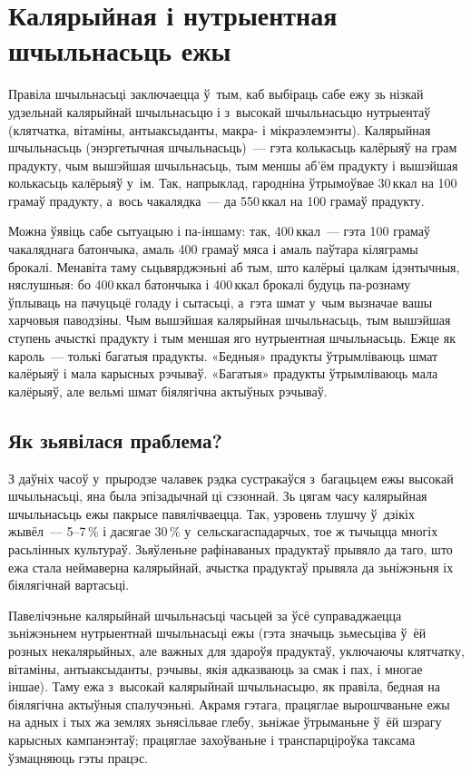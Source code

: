 
\chapter{Калярыйная і нутрыентная шчыльнасьць ежы}

Правіла шчыльнасьці заключаецца ў~тым, каб выбіраць сабе ежу зь нізкай удзельнай калярыйнай шчыльнасьцю і з~высокай шчыльнасьцю нутрыентаў (клятчатка, вітаміны, антыаксыданты, макра- і мікраэлемэнты). Калярыйная шчыльнасьць (энэргетычная шчыльнасьць)~--- гэта колькасьць калёрыяў на грам прадукту, чым вышэйшая шчыльнасьць, тым меншы аб'ём прадукту і вышэйшая колькасьць калёрыяў у~ім. Так, напрыклад, гародніна ўтрымоўвае 30\,ккал на 100 грамаў прадукту, а~вось чакалядка~--- да 550\,ккал на 100 грамаў прадукту.

Можна ўявіць сабе сытуацыю і па-іншаму: так, 400\,ккал~--- гэта 100 грамаў чакаляднага батончыка, амаль 400 грамаў мяса і амаль паўтара кіляграмы брокалі. Менавіта таму сьцьвярджэньні аб тым, што калёрыі цалкам ідэнтычныя, няслушныя: бо 400\,ккал батончыка і 400\,ккал брокалі будуць па-рознаму ўплываць на пачуцьцё голаду і сытасьці, а~гэта шмат у~чым вызначае вашы харчовыя паводзіны. Чым вышэйшая калярыйная шчыльнасьць, тым вышэйшая ступень ачысткі прадукту і тым меншая яго нутрыентная шчыльнасьць. Ежце як кароль~--- толькі багатыя прадукты. «Бедныя» прадукты ўтрымліваюць шмат калёрыяў і мала карысных рэчываў. «Багатыя» прадукты ўтрымліваюць мала калёрыяў, але вельмі шмат біялягічна актыўных рэчываў.

\section{Як зьявілася праблема?}

З даўніх часоў у~прыродзе чалавек рэдка сустракаўся з~багацьцем ежы высокай шчыльнасьці, яна была эпізадычнай ці сэзоннай. Зь цягам часу калярыйная шчыльнасьць ежы пакрысе павялічваецца. Так, узровень тлушчу ў~дзікіх жывёл~--- 5--7\,\% і дасягае 30\,\% у~сельскагаспадарчых, тое ж тычыцца многіх расьлінных культураў. Зьяўленьне рафінаваных прадуктаў прывяло да таго, што ежа стала неймаверна калярыйнай, ачыстка прадуктаў прывяла да зьніжэньня іх біялягічнай вартасьці.

Павелічэньне калярыйнай шчыльнасьці часьцей за ўсё суправаджаецца зьніжэньнем нутрыентнай шчыльнасьці ежы (гэта значыць зьмесьціва ў~ёй розных некалярыйных, але важных для здароўя прадуктаў, уключаючы клятчатку, вітаміны, антыаксыданты, рэчывы, якія адказваюць за смак і пах, і многае іншае). Таму ежа з~высокай калярыйнай шчыльнасьцю, як правіла, бедная на біялягічна актыўныя спалучэньні. Акрамя гэтага, працяглае вырошчваньне ежы на адных і тых жа землях зьнясільвае глебу, зьніжае ўтрыманьне ў~ёй шэрагу карысных кампанэнтаў; працяглае захоўваньне і транспарціроўка таксама ўзмацняюць гэты працэс.

